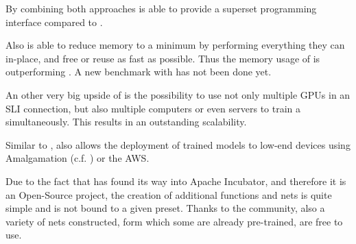 By combining both approaches \mxnet is able to provide a superset programming interface compared to \caffe. \cite{chen2015mxnet}

Also \mxnet is able to reduce memory to a minimum by performing everything they can in-place, and free or reuse as fast as possible. Thus the memory usage of \mxnet is outperforming \caffe. \cite{chen2015mxnet} %
A new benchmark with \caffetwo has not been done yet.

An other very big upside of \mxnet is the possibility to use not only multiple GPUs in an SLI connection, but also multiple computers or even servers to train a \nn simultaneously. This results in an outstanding scalability. \cite{chen2015mxnet}

Similar to \caffetwo, \mxnet also allows the deployment of trained models to low-end devices using Amalgamation (c.f. \cite{MxNetHomepage}) or the AWS.

Due to the fact that \mxnet has found its way into Apache Incubator, and therefore it is an Open-Source project, the creation of additional functions and nets is quite simple and is not bound to a given preset. Thanks to the community, also a variety of nets constructed, form which some are already pre-trained, are free to use. \cite{MxNetGithubModelGallery}
